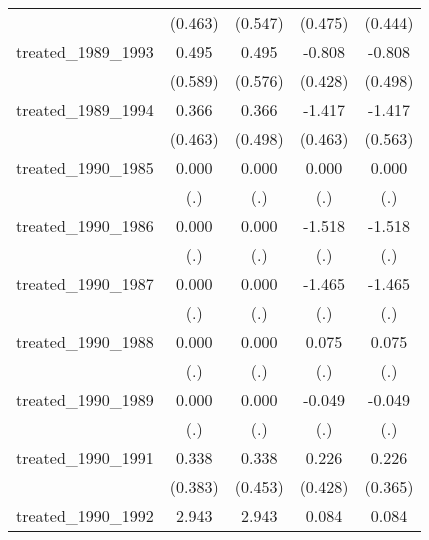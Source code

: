 {\begin{tabular}{l*{4}{c}}
            &     (0.463)         &     (0.547)         &     (0.475)         &     (0.444)         \\
[1em]
treated\_1989\_1993&       0.495         &       0.495         &      -0.808         &      -0.808         \\
            &     (0.589)         &     (0.576)         &     (0.428)         &     (0.498)         \\
[1em]
treated\_1989\_1994&       0.366         &       0.366         &      -1.417\sym{**} &      -1.417\sym{*}  \\
            &     (0.463)         &     (0.498)         &     (0.463)         &     (0.563)         \\
[1em]
treated\_1990\_1985&       0.000         &       0.000         &       0.000         &       0.000         \\
            &         (.)         &         (.)         &         (.)         &         (.)         \\
[1em]
treated\_1990\_1986&       0.000         &       0.000         &      -1.518         &      -1.518         \\
            &         (.)         &         (.)         &         (.)         &         (.)         \\
[1em]
treated\_1990\_1987&       0.000         &       0.000         &      -1.465         &      -1.465         \\
            &         (.)         &         (.)         &         (.)         &         (.)         \\
[1em]
treated\_1990\_1988&       0.000         &       0.000         &       0.075         &       0.075         \\
            &         (.)         &         (.)         &         (.)         &         (.)         \\
[1em]
treated\_1990\_1989&       0.000         &       0.000         &      -0.049         &      -0.049         \\
            &         (.)         &         (.)         &         (.)         &         (.)         \\
[1em]
treated\_1990\_1991&       0.338         &       0.338         &       0.226         &       0.226         \\
            &     (0.383)         &     (0.453)         &     (0.428)         &     (0.365)         \\
[1em]
treated\_1990\_1992&       2.943\sym{***}&       2.943\sym{***}&       0.084         &       0.084         \\

\end{tabular}}
